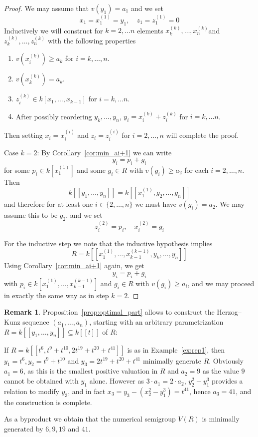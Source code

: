 \documentclass[12pt]{amsart}
\theoremstyle{plain}%
\theoremstyle{definition}
\newtheorem{notiz}{Remark}[section]
\renewcommand{\(}{\left(}
\renewcommand{\)}{\right)}
\renewcommand{\geq}{\geqslant}
\begin{document}
\begin{proof}
We may assume that $v(y_1) = a_1$ and we set 
	$$ x_1 = x_1^{(1)} = y_1, \quad z_1 = z_1^{(1)} = 0 $$
Inductively we will construct for $k = 2, \ldots n$ elements 
$x_k^{(k)}, \ldots, x_n^{(k)}$and $z_k^{(k)}, \ldots, 
z_n^{(k)}$ with the following properties 
\begin{enumerate}
\item $v(x_i^{(k)}) \geq a_k$ for $i =k, \ldots, n$. 
\item $v(x_k^{(k)}) = a_k$. 
\item $z_i^{(k)} \in k[x_1, \ldots, x_{k-1}] $ for  
$i = k, \ldots n$. 
\item After possibly reordering $y_k, \ldots, y_n$, 
$y_i = x_i^{(k)} + z_i^{(k)}$ for  $i = k, \ldots n$.
\end{enumerate}
Then setting $x_i = x_i^{(i)}$ and $z_i = z_i^{(i)}$ for 
$i = 2, \ldots, n$ will complete the proof. 

Case $k = 2$: By Corollary~\ref{cor:min_ai+1} we can write 
	$$ y_i = p_i + g_i $$
for some $p_i \in k[x_1^{(1)}]$ and some $g_i \in R$ with  
$v(g_i) \geq a_2$ for each $i = 2, \ldots, n$. Then 
	$$ k[[y_1, \ldots, y_n]] = k[[x_1^{(1)} , g_2, \ldots, g_n]] $$
and therefore for at least one $i \in \{2, \ldots, n\}$ we 
must have $v(g_i) = a_2$. We may assume this to be $g_2$, 
and we set 
	$$ z_i^{(2)} = p_i, \quad 
	x_i^{(2)} = g_i $$

For the inductive step we note that the inductive hypothesis 
implies 
	$$ R = k[[x_1^{(1)}, \ldots, x_{k-1}^{(k-1)}, y_k, 
    \ldots, y_n]] $$
Using Corollary~\ref{cor:min_ai+1} again, we get 
	$$ y_i = p_i + g_i $$
with $p_i \in k[x_1^{(1)}, \ldots, x_{k-1}^{(k-1)}]$ and 
$g_i \in R$ with $v(g_i) \geq a_i$, and we may proceed in 
exactly the same way as in step $k = 2$. 
\end{proof}

\begin{notiz} 
Proposition~\ref{prop:optimal_part} allows to construct the 
Herzog--Kunz sequence $(a_1, \ldots, a_n)$, starting with 
an arbitrary parametrization $R = k[[y_1, \ldots, y_n]] 
\subseteq k[[t]]$ of $R$: 

If $R = k[[t^6, t^9+t^{10}, 2 t^{19} +t^{20}+t^{41}]]$ is 
as in Example~\ref{ex:rep1}, then $y_1=t^6, 
y_2=t^{9}+t^{10}$ and $y_3 = 2t^{19}+t^{20}+t^{41}$ 
minimally generate $R$. Obviously $a_1=6$, as this is the 
smallest positive valuation in $R$ and $a_2=9$ as the value 
$9$ cannot be obtained with $y_1$ alone. However as $3\cdot 
a_1 = 2 \cdot a_2$, $y_2^2-y_1^3$ provides a relation to 
modify $y_3$, and in fact $x_3 = y_3-(x_2^2-y_1^3) = 
t^{41}$, hence $a_3 = 41$, and the construction is complete. 

As a byproduct we obtain that the numerical semigroup 
$V(R)$ is minimally generated by $6,9,19$ and $41$.
\end{notiz}
\end{document}
